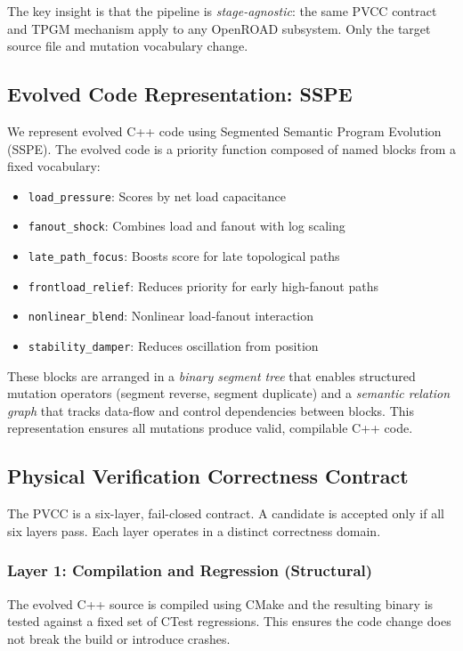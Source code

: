 \documentclass[conference]{IEEEtran}
\begin{document}
The key insight is that the pipeline is \textit{stage-agnostic}: the same PVCC contract and TPGM mechanism apply to any OpenROAD subsystem. Only the target source file and mutation vocabulary change.

\subsection{Evolved Code Representation: SSPE}

We represent evolved C++ code using Segmented Semantic Program Evolution (SSPE). The evolved code is a priority function composed of named blocks from a fixed vocabulary:

\begin{itemize}
\item \texttt{load\_pressure}: Scores by net load capacitance
\item \texttt{fanout\_shock}: Combines load and fanout with log scaling
\item \texttt{late\_path\_focus}: Boosts score for late topological paths
\item \texttt{frontload\_relief}: Reduces priority for early high-fanout paths
\item \texttt{nonlinear\_blend}: Nonlinear load-fanout interaction
\item \texttt{stability\_damper}: Reduces oscillation from position
\end{itemize}

These blocks are arranged in a \textit{binary segment tree} that enables structured mutation operators (segment reverse, segment duplicate) and a \textit{semantic relation graph} that tracks data-flow and control dependencies between blocks. This representation ensures all mutations produce valid, compilable C++ code.

\subsection{Physical Verification Correctness Contract}

The PVCC is a six-layer, fail-closed contract. A candidate is accepted only if all six layers pass. Each layer operates in a distinct correctness domain.

\subsubsection{Layer 1: Compilation and Regression (Structural)}
The evolved C++ source is compiled using CMake and the resulting binary is tested against a fixed set of CTest regressions. This ensures the code change does not break the build or introduce crashes.
\end{document}
